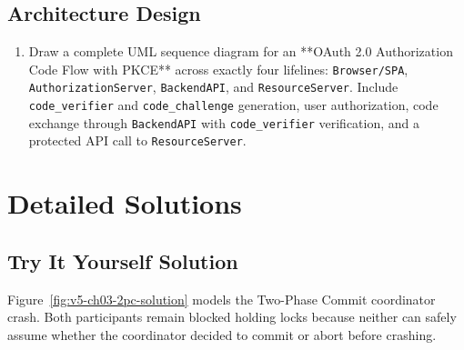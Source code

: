 \subsection*{Architecture Design}
\begin{enumerate}[label=\textbf{Exercise~\thechapter.\arabic*}, leftmargin=*, start=4]
  \item Draw a complete UML sequence diagram for an **OAuth 2.0 Authorization Code Flow with PKCE** across exactly four lifelines: \texttt{Browser/SPA}, \texttt{AuthorizationServer}, \texttt{BackendAPI}, and \texttt{ResourceServer}. Include \texttt{code\_verifier} and \texttt{code\_challenge} generation, user authorization, code exchange through \texttt{BackendAPI} with \texttt{code\_verifier} verification, and a protected API call to \texttt{ResourceServer}.
\end{enumerate}

\section{Detailed Solutions}

\subsection*{Try It Yourself Solution}
Figure~\ref{fig:v5-ch03-2pc-solution} models the Two-Phase Commit coordinator crash. Both participants remain blocked holding locks because neither can safely assume whether the coordinator decided to commit or abort before crashing.

